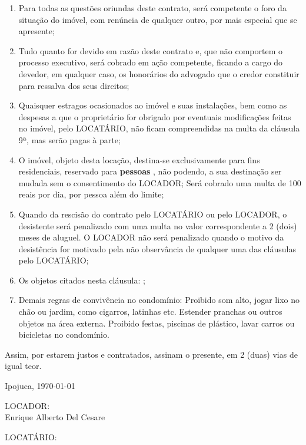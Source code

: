 \documentclass[a4paper,12pt]{article}
\begin{document}
\begin{enumerate}
\item Para todas as questões oriundas deste contrato, será competente o foro da situação do imóvel, com renúncia de qualquer outro, por mais especial que se apresente;
\item Tudo quanto for devido em razão deste contrato e, que não comportem o processo executivo, será cobrado em ação competente, ficando a cargo do devedor, em qualquer caso, os honorários do advogado que o credor constituir para ressalva dos seus direitos;
\item Quaisquer estragos ocasionados ao imóvel e suas instalações, bem como as despesas a que o proprietário for obrigado por eventuais modificações feitas no imóvel, pelo LOCATÁRIO, não ficam compreendidas na multa da cláusula 9ª, mas serão pagas à parte;
\item O imóvel, objeto desta locação, destina-se exclusivamente para fins residenciais, 
reservado para \textbf{  pessoas },  não podendo, a sua destinação ser mudada sem o consentimento do LOCADOR;
Será cobrado uma multa de 100 reais por dia, por pessoa além do limite;
\item Quando da rescisão do contrato pelo LOCATÁRIO  ou pelo LOCADOR, o desistente será penalizado com uma multa no valor correspondente a 2 (dois) meses de aluguel. O LOCADOR não será penalizado quando o motivo da desistência for motivado pela não observância de qualquer uma das cláusulas pelo LOCATÁRIO;
\item Os objetos citados nesta cláusula: ;
\item Demais regras de convivência no condomínio: Proibido som alto, jogar lixo no chão ou jardim, como cigarros, latinhas etc. 
Estender pranchas ou outros objetos na área externa.
Proibido festas, piscinas de plástico, lavar carros ou bicicletas no condomínio.

\end{enumerate}
Assim, por estarem justos e contratados, assinam o presente, em 2 (duas) vias de igual teor.

\begin{flushright}
Ipojuca, \today
\end{flushright}

\begin{center}

\vspace{2cm}

LOCADOR: \hrulefill
\\Enrique Alberto Del Cesare

\vspace{2.5cm}

LOCATÁRIO: \hrulefill
\\
 \end{center}
\end{document}
